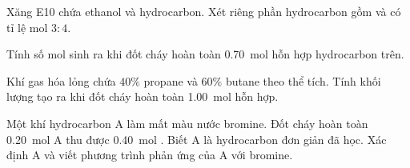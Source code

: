 \begin{tuluyen}
Xăng E10 chứa ethanol và hydrocarbon. Xét riêng phần hydrocarbon gồm  và  có tỉ lệ mol $3:4$.

Tính số mol  sinh ra khi đốt cháy hoàn toàn \SI{0.70}{\mole} hỗn hợp hydrocarbon trên.
\end{tuluyen}

\begin{tuluyen}
Khí gas hóa lỏng chứa $40\%$ propane và $60\%$ butane theo thể tích. Tính khối lượng  tạo ra khi đốt cháy hoàn toàn \SI{1.00}{\mole} hỗn hợp.
\end{tuluyen}

\begin{tuluyen}
Một khí hydrocarbon A làm mất màu nước bromine. Đốt cháy hoàn toàn \SI{0.20}{\mole} A thu được \SI{0.40}{\mole} . Biết A là hydrocarbon đơn giản đã học. Xác định A và viết phương trình phản ứng của A với bromine.
\end{tuluyen}

